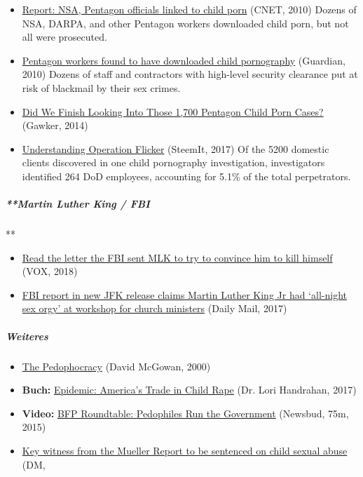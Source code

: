 \begin{itemize}
\tightlist
\item
  \href{https://www.cnet.com/news/report-nsa-pentagon-officials-linked-to-child-porn/}{Report:
  NSA, Pentagon officials linked to child porn} (CNET, 2010) Dozens of
  NSA, DARPA, and other Pentagon workers downloaded child porn, but not
  all were prosecuted.
\item
  \href{https://www.theguardian.com/world/2010/jul/24/pentagon-us-staff-downloaded-child-pornography}{Pentagon
  workers found to have downloaded child pornography} (Guardian, 2010)
  Dozens of staff and contractors with high-level security clearance put
  at risk of blackmail by their sex crimes.
\item
  \href{http://blackbag.gawker.com/uh-did-we-finish-looking-into-those-1-700-pentagon-chi-1609060355}{Did
  We Finish Looking Into Those 1,700 Pentagon Child Porn Cases?}
  (Gawker, 2014)
\item
  \href{https://steemit.com/operation/@obedientworker/understanding-operation-flicker}{Understanding
  Operation Flicker} (SteemIt, 2017) Of the 5200 domestic clients
  discovered in one child pornography investigation, investigators
  identified 264 DoD employees, accounting for 5.1\% of the total
  perpetrators.
\end{itemize}

\hypertarget{martin-luther-king--fbi}{%
\subparagraph{**Martin Luther King /
FBI}\label{martin-luther-king--fbi}}

**

\begin{itemize}
\tightlist
\item
  \href{https://www.vox.com/xpress/2014/11/12/7204453/martin-luther-king-fbi-letter}{Read
  the letter the FBI sent MLK to try to convince him to kill himself}
  (VOX, 2018)
\item
  \href{https://www.dailymail.co.uk/news/article-5048849/FBI-report-claims-MLK-night-sex-orgies.html}{FBI
  report in new JFK release claims Martin Luther King Jr had `all-night
  sex orgy' at workshop for church ministers} (Daily Mail, 2017)
\end{itemize}

\hypertarget{weiteres-2}{%
\subparagraph{\texorpdfstring{\textbf{Weiteres}}{Weiteres}}\label{weiteres-2}}

\begin{itemize}
\tightlist
\item
  \href{http://www.whale.to/b/pedophocracy.html}{The Pedophocracy}
  (David McGowan, 2000)
\item
  \textbf{Buch:} \href{http://www.lorihandrahan.com/}{Epidemic:
  America's Trade in Child Rape} (Dr. Lori Handrahan, 2017)
\item
  \textbf{Video:} \href{https://www.youtube.com/watch?v=yP1MtaSIePk}{BFP
  Roundtable: Pedophiles Run the Government} (Newsbud, 75m, 2015)
\item
  \href{https://www.dailymail.co.uk/news/article-8462385/Key-witness-Mueller-Report-sentenced-child-sex-charges.html}{Key
  witness from the Mueller Report to be sentenced on child sexual abuse}
  (DM,
\end{itemize}

